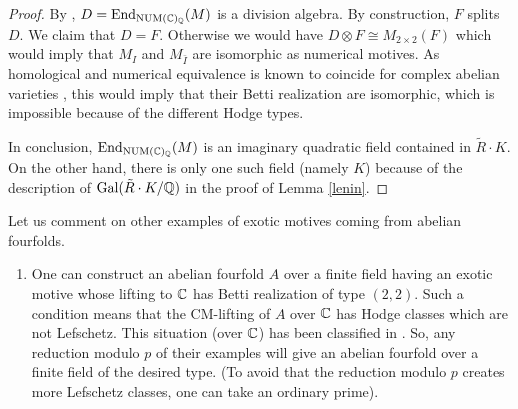 \begin{proof}
By \cite{Jann},  $D=\textnormal{End}_{\mathrm{NUM}(\mathbb{C})_{\mathbb{Q}}}  (M)$  is a division algebra. By construction, $F$ splits $D$. We claim that $D=F$. Otherwise we would have $D \otimes F \cong M_{2 \times 2}(F)$ which would imply that $M_{I}$ and $M_{\bar{I}} $ are isomorphic as numerical motives. As homological and numerical equivalence is known to coincide for complex abelian varieties \cite{Lieb}, this would imply that their Betti realization are isomorphic, which is impossible because of the different Hodge types.

In conclusion,  $\textnormal{End}_{\mathrm{NUM}(\mathbb{C})_{\mathbb{Q}}}  (M)$ is an imaginary quadratic field contained in $ \tilde{R}\cdot K$. On the other hand,  there is only one such field (namely $K$) because of the description of  $\textnormal{Gal} (\tilde{R}\cdot K/\mathbb{Q})$ in the proof of Lemma \ref{lenin}.
\end{proof}
\begin{remark}
\notready\label{altreesotiche}
Let us comment on other examples of exotic motives coming from abelian fourfolds.
\begin{enumerate}
\item One can construct  an abelian fourfold $A$ over a finite field having an exotic motive whose lifting to $\mathbb{C}$ has Betti realization of type $(2,2)$. Such a condition means that  the CM-lifting of $A$  over $\mathbb{C}$   has Hodge classes which are not Lefschetz. This   situation (over $\mathbb{C}$) has been classified in \cite{MooZa}. So, any reduction modulo $p$ of their examples will give an abelian fourfold over a finite field of the desired type. (To avoid that the reduction modulo $p$ creates more Lefschetz classes, one can take an ordinary prime).


\end{enumerate}
\end{remark}
